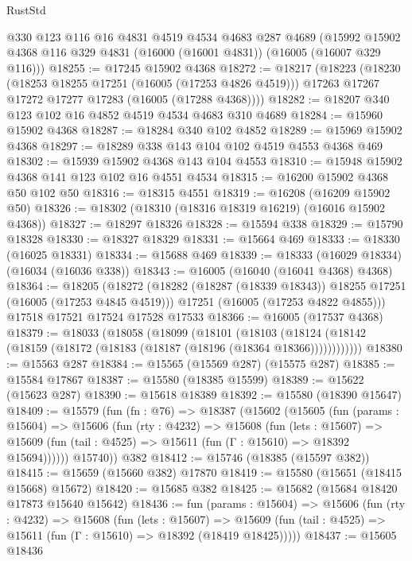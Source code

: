\begin{lexlean}{RustStd}
\begin{coremodule}
    @330
    @123
    @116
    @16
    @4831
    @4519
    @4534
    @4683
    @287
    @4689
    (@15992 @15902 @4368 @116 @329 @4831 (@16000 (@16001 @4831)) (@16005 (@16007 @329 @116)))
@18255 := @17245 @15902 @4368
@18272 := @18217
    (@18223
      (@18230
        (@18253 @18255 @17251 (@16005 (@17253 @4826 @4519)))
        @17263
        @17267
        @17272
        @17277
        @17283
        (@16005 (@17288 @4368))))
@18282 := @18207 @340 @123 @102 @16 @4852 @4519 @4534 @4683 @310 @4689
@18284 := @15960 @15902 @4368
@18287 := @18284 @340 @102 @4852
@18289 := @15969 @15902 @4368
@18297 := @18289 @338 @143 @104 @102 @4519 @4553 @4368 @469
@18302 := @15939 @15902 @4368 @143 @104 @4553
@18310 := @15948 @15902 @4368 @141 @123 @102 @16 @4551 @4534
@18315 := @16200 @15902 @4368 @50 @102 @50
@18316 := @18315 @4551
@18319 := @16208 (@16209 @15902 @50)
@18326 := @18302 (@18310 (@18316 @18319 @16219) (@16016 @15902 @4368))
@18327 := @18297 @18326
@18328 := @15594 @338
@18329 := @15790 @18328
@18330 := @18327 @18329
@18331 := @15664 @469
@18333 := @18330 (@16025 @18331)
@18334 := @15688 @469
@18339 := @18333 (@16029 @18334) (@16034 (@16036 @338))
@18343 := @16005 (@16040 (@16041 @4368) @4368)
@18364 := @18205
    (@18272
      (@18282 (@18287 (@18339 @18343)) @18255 @17251 (@16005 (@17253 @4845 @4519)))
      @17251
      (@16005 (@17253 @4822 @4855)))
    @17518
    @17521
    @17524
    @17528
    @17533
@18366 := @16005 (@17537 @4368)
@18379 := @18033
    (@18058
      (@18099
        (@18101
          (@18103 (@18124 (@18142 (@18159 (@18172 (@18183 (@18187 (@18196 (@18364 @18366))))))))))))
@18380 := @15563 @287
@18384 := @15565 (@15569 @287) (@15575 @287)
@18385 := @15584 @17867
@18387 := @15580 (@18385 @15599)
@18389 := @15622 (@15623 @287)
@18390 := @15618 @18389
@18392 := @15580 (@18390 @15647)
@18409 := @15579
    (fun (fn : @76) =>
    @18387
      (@15602
        (@15605
          (fun (params : @15604) =>
          @15606
            (fun (rty : @4232) =>
            @15608
              (fun (lets : @15607) =>
              @15609 (fun (tail : @4525) => @15611 (fun (Γ : @15610) => @18392 @15694))))))
        @15740))
    @382
@18412 := @15746 (@18385 (@15597 @382))
@18415 := @15659 (@15660 @382) @17870
@18419 := @15580 (@15651 (@18415 @15668) @15672)
@18420 := @15685 @382
@18425 := @15682 (@15684 @18420 @17873 @15640 @15642)
@18436 := fun (params : @15604) =>
  @15606
    (fun (rty : @4232) =>
    @15608
      (fun (lets : @15607) =>
      @15609 (fun (tail : @4525) => @15611 (fun (Γ : @15610) => @18392 (@18419 @18425)))))
@18437 := @15605 @18436

\end{coremodule}
\end{lexlean}
